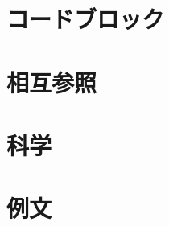 \documentclass{jlreq}
\begin{document}
\section{コードブロック}



\section{相互参照}


\section{科学}




\section{例文}


\end{document}
